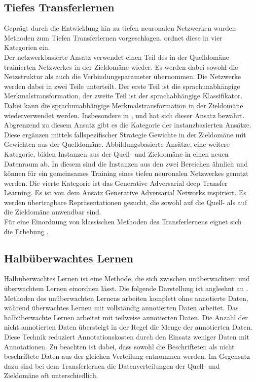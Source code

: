 		\subsection{Tiefes Transferlernen}
		Geprägt durch die Entwicklung hin zu tiefen neuronalen Netzwerken wurden Methoden zum Tiefen Transferlernen vorgeschlagen. \cite{Tan.2018} ordnet diese in vier Kategorien ein. \\
		Der netzwerkbasierte Ansatz verwendet einen Teil des in der Quelldomäne trainierten Netzwerkes in der Zieldomäne wieder. Es werden dabei sowohl die Netzstruktur als auch die Verbindungsparameter übernommen. Die Netzwerke werden dabei in zwei Teile unterteilt. Der erste Teil ist die sprachunabhängige Merkmalstransformation, der zweite Teil ist der sprachabhängige Klassifikator. Dabei kann die sprachunabhängige Merkmalstransformation in der Zieldomäne wiederverwendet werden. Insbesondere in \cite{JasonYosinski.2014}, \cite{Long.2016} und \cite{George.2018} hat sich dieser Ansatz bewährt. Abgrenzend zu diesem Ansatz gibt es die Kategorie der instanzbasierten Ansätze. Diese ergänzen mittels fallspezifischer Strategie Gewichte in der Zieldomäne mit Gewichten aus der Quelldomäne. Abbildungsbasierte Ansätze, eine weitere Kategorie, bilden Instanzen aus der Quell- und Zieldomäne in einen neuen Datenraum ab. In diesem sind die Instanzen aus den zwei Bereichen ähnlich und können für ein gemeinsames Training eines tiefen neuronalen Netzwerkes genutzt werden. Die vierte Kategorie ist das Generative Adversarial deep Transfer Learning. Es ist von dem Ansatz Generative Adversarial Networks \cite{IanJ.Goodfellow.2014} inspiriert. Es werden übertragbare Repräsentationen gesucht, die sowohl auf die Quell- als auf die Zieldomäne anwendbar sind. \\
		Für eine Einordnung von klassischen Methoden des Transferlernens eignet sich die Erhebung \cite{FuzhenZhuang.2019}.
		 
		\subsection{Halbüberwachtes Lernen}
		Halbüberwachtes Lernen ist eine Methode, die sich zwischen unüberwachtem und überwachtem Lernen einordnen lässt. Die folgende Darstellung ist angleehnt an \cite{Chapelle.2010} . Methoden des unüberwachten Lernens arbeiten komplett ohne annotierte Daten, während überwachtes Lernen mit vollständig annotierten Daten arbeitet. Das halbüberwachte Lernen arbeitet mit teilweise annotierten Daten. Die Anzahl der nicht annotierten Daten übersteigt in der Regel die Menge der annotierten Daten. Diese Technik reduziert Annotationskosten durch den Einsatz weniger Daten mit Annotationen. Zu beachten ist dabei, dass sowohl die Beschrifteten als nicht beschriftete Daten aus der gleichen Verteilung entnommen werden. 
		Im Gegensatz dazu sind bei dem Transferlernen die Datenverteilungen der Quell- und Zieldomäne oft unterschiedlich.
				
